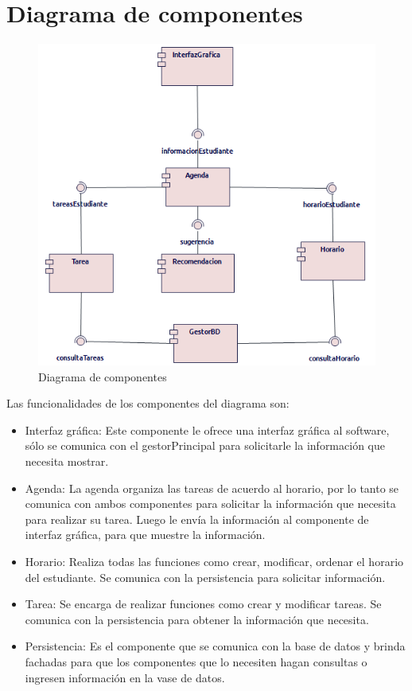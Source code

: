 \section{Diagrama de componentes}
\begin{figure}[H]
	\centering
	\includegraphics[width=1\linewidth]{diseno/componentes/img/diagramaComponentesv2}
	\caption{Diagrama de componentes}
	\label{fig:componentes}
\end{figure}
Las funcionalidades de los componentes del diagrama son:
\begin{itemize}
	\item Interfaz gráfica: Este componente le ofrece una interfaz gráfica al software, sólo se comunica con el gestorPrincipal para solicitarle la información que necesita mostrar.
	\item Agenda: La agenda organiza las tareas de acuerdo al horario, por lo tanto se comunica con ambos componentes para solicitar la información que necesita para realizar su tarea. Luego le envía la información al componente de interfaz gráfica, para que muestre la información.
	\item Horario: Realiza todas las funciones como crear, modificar, ordenar el horario del estudiante. Se comunica con la persistencia para solicitar información.
	\item Tarea: Se encarga de realizar funciones como crear y  modificar tareas. Se comunica con la persistencia para obtener la información que necesita.
	\item Persistencia: Es el componente que se comunica con la base de datos y brinda fachadas para que los componentes que lo necesiten hagan consultas o ingresen información en la vase de datos.
\end{itemize}
	

